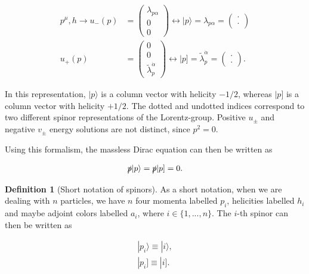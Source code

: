 \documentclass{article}
\theoremstyle{definition}
\newtheorem{definition}{Definition}[section]
\numberwithin{equation}{section}
\begin{document}
\begin{align*}
    p^{\mu}, h \rightarrow u_{-}(p) &= \begin{pmatrix} \lambda_{p \alpha} \\ 0 \\ 0\end{pmatrix} \leftrightarrow | p \rangle = \lambda_{p \alpha} = \begin{pmatrix}\cdot \\ \cdot\end{pmatrix} \\
    u_{+}(p) &= \begin{pmatrix}0 \\ 0 \\ \tilde{\lambda}_{p}^{\dot{\alpha}} \end{pmatrix} \leftrightarrow | p \rbrack = \tilde{\lambda}^{\dot{\alpha}}_p = \begin{pmatrix}\cdot \\ \cdot\end{pmatrix}.
\end{align*}

In this representation, $| p \rangle$ is a column vector with helicity $-1/2$, whereas $| p \rbrack$ is a column vector with helicity $+1/2$. The dotted and undotted indices correspond to two different spinor representations of the Lorentz-group. Positive $u_{\pm}$ and negative $v_{\pm}$ energy solutions are not distinct, since $p^2 = 0$.

Using this formalism, the massless Dirac equation can then be written as

\begin{align*}
    \slashed{p} | p \rangle = \slashed{p} | p \rbrack = 0.
\end{align*}

\begin{definition}[Short notation of spinors]

As a short notation, when we are dealing with $n$ particles, we have $n$ four momenta labelled $p_i$, helicities labelled $h_i$ and maybe adjoint colors labelled $a_i$, where $i \in \{1, ..., n\}$. The $i$-th spinor can then be written as

\begin{align*}
    | p_i \rangle \equiv | i \rangle, \\
    | p_i \rbrack \equiv | i \rbrack.
\end{align*}

\end{definition}
\end{document}

